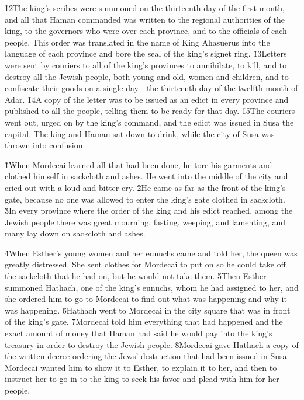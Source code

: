 \v{12}The king's scribes were summoned on the thirteenth day of the first month, and all that Haman commanded was written to the regional authorities of the king, to the governors who were over each province, and to the officials of each people. This order was translated in the name of King Ahasuerus into the language of each province and bore the seal of the king's signet ring. \v{13}Letters were sent by couriers to all of the king's provinces to annihilate, to kill, and to destroy all the Jewish people, both young and old, women and children, and to confiscate their goods on a single day---the thirteenth day of the twelfth month of Adar. \v{14}A copy of the letter was to be issued as an edict in every province and published to all the people, telling them to be ready for that day. \v{15}The couriers went out, urged on by the king's command, and the edict was issued in Susa the capital. The king and Haman sat down to drink, while the city of Susa was thrown into confusion.

\v{1}When Mordecai learned all that had been done, he tore his garments and clothed himself in sackcloth and ashes. He went into the middle of the city and cried out with a loud and bitter cry. \v{2}He came as far as the front of the king's gate, because no one was allowed to enter the king's gate clothed in sackcloth. \v{3}In every province where the order of the king and his edict reached, among the Jewish people there was great mourning, fasting, weeping, and lamenting, and many lay down on sackcloth and ashes.

\v{4}When Esther's young women and her eunuchs came and told her, the queen was greatly distressed. She sent clothes for Mordecai to put on so he could take off the sackcloth that he had on, but he would not take them. \v{5}Then Esther summoned Hathach, one of the king's eunuchs, whom he had assigned to her, and she ordered him to go to Mordecai to find out what was happening and why it was happening. \v{6}Hathach went to Mordecai in the city square that was in front of the king's gate. \v{7}Mordecai told him everything that had happened and the exact amount of money that Haman had said he would pay into the king's treasury in order to destroy the Jewish people. \v{8}Mordecai gave Hathach a copy of the written decree ordering the Jews' destruction that had been issued in Susa. Mordecai wanted him to show it to Esther, to explain it to her, and then to instruct her to go in to the king to seek his favor and plead with him for her people.

